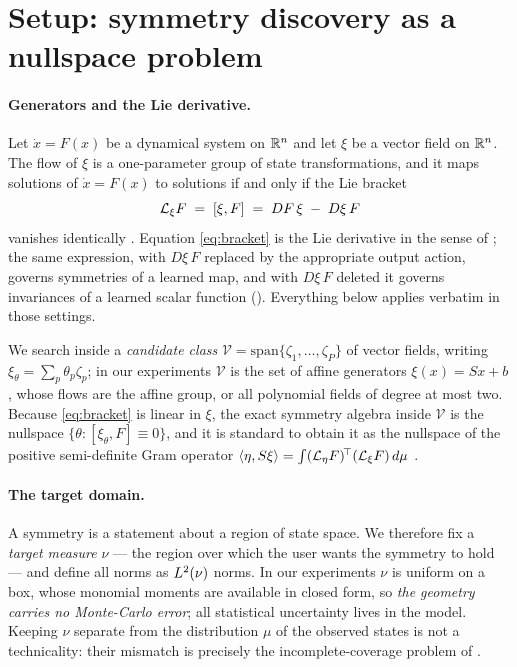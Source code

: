 \section{Setup: symmetry discovery as a nullspace problem}
\label{sec:setup}

\paragraph{Generators and the Lie derivative.} Let $\dot x = F(x)$ be a
dynamical system on $\mathbb{R}^n$ and let $\xi$ be a vector field on $\mathbb{R}^n$. The flow
of $\xi$ is a one-parameter group of state transformations, and it maps
solutions of $\dot x = F(x)$ to solutions if and only if the Lie bracket
\begin{equation}
  \mathcal{L}_\xi F \;=\; [\xi, F] \;=\; DF\,\xi \;-\; D\xi\, F
  \label{eq:bracket}
\end{equation}
vanishes identically \citep[Ch.~2]{olver1993applications}. Equation
\eqref{eq:bracket} is the Lie derivative in the sense of
\citet[Eq.~16]{otto2025unified}; the same expression, with $D\xi\,F$ replaced by
the appropriate output action, governs symmetries of a learned map, and with
$D\xi\,F$ deleted it governs invariances of a learned scalar function
(). Everything below applies verbatim in those settings.

We search inside a \emph{candidate class} $\mathcal V = \mathrm{span}\{\zeta_1,
\dots,\zeta_P\}$ of vector fields, writing $\xi_\theta = \sum_p \theta_p
\zeta_p$; in our experiments $\mathcal V$ is the set of affine generators
$\xi(x) = Sx + b$, whose flows are the affine group, or all polynomial fields of
degree at most two. Because \eqref{eq:bracket} is linear in $\xi$, the exact
symmetry algebra inside $\mathcal V$ is the nullspace
$\{\theta : [\xi_\theta,F] \equiv 0\}$, and it is standard to obtain it as the
nullspace of the positive semi-definite Gram operator
$\langle \eta, S\xi\rangle = \int (\mathcal{L}_\eta F)^{\!\top} (\mathcal{L}_\xi F)\, d\mu$
\citep[\S7]{otto2025unified}.

\paragraph{The target domain.} A symmetry is a statement about a region of state
space. We therefore fix a \emph{target measure} $\nu$ --- the region over which
the user wants the symmetry to hold --- and define all norms as $L^2(\nu)$
norms. In our experiments $\nu$ is uniform on a box, whose monomial moments are
available in closed form, so \emph{the geometry carries no Monte-Carlo error};
all statistical uncertainty lives in the model. Keeping $\nu$ separate from the
distribution $\mu$ of the observed states is not a technicality: their mismatch
is precisely the incomplete-coverage problem of .

